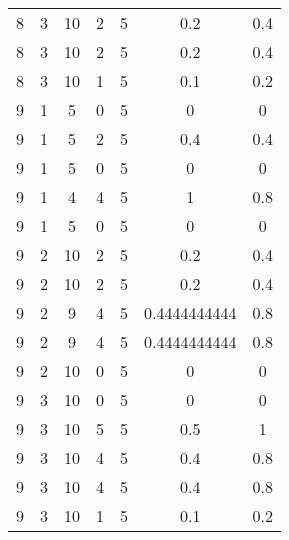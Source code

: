 \begin{longtable}[c]{| c | c | c | c | c | c | c |}
8	&	3	&	10	&	2	&	5	&	0.2	&	0.4	\\
8	&	3	&	10	&	2	&	5	&	0.2	&	0.4	\\
8	&	3	&	10	&	1	&	5	&	0.1	&	0.2	\\
9	&	1	&	5	&	0	&	5	&	0	&	0	\\
9	&	1	&	5	&	2	&	5	&	0.4	&	0.4	\\
9	&	1	&	5	&	0	&	5	&	0	&	0	\\
9	&	1	&	4	&	4	&	5	&	1	&	0.8	\\
9	&	1	&	5	&	0	&	5	&	0	&	0	\\
9	&	2	&	10	&	2	&	5	&	0.2	&	0.4	\\
9	&	2	&	10	&	2	&	5	&	0.2	&	0.4	\\
9	&	2	&	9	&	4	&	5	&	0.4444444444	&	0.8	\\
9	&	2	&	9	&	4	&	5	&	0.4444444444	&	0.8	\\
9	&	2	&	10	&	0	&	5	&	0	&	0	\\
9	&	3	&	10	&	0	&	5	&	0	&	0	\\
9	&	3	&	10	&	5	&	5	&	0.5	&	1	\\
9	&	3	&	10	&	4	&	5	&	0.4	&	0.8	\\
9	&	3	&	10	&	4	&	5	&	0.4	&	0.8	\\
9	&	3	&	10	&	1	&	5	&	0.1	&	0.2	\\

\end{longtable}







